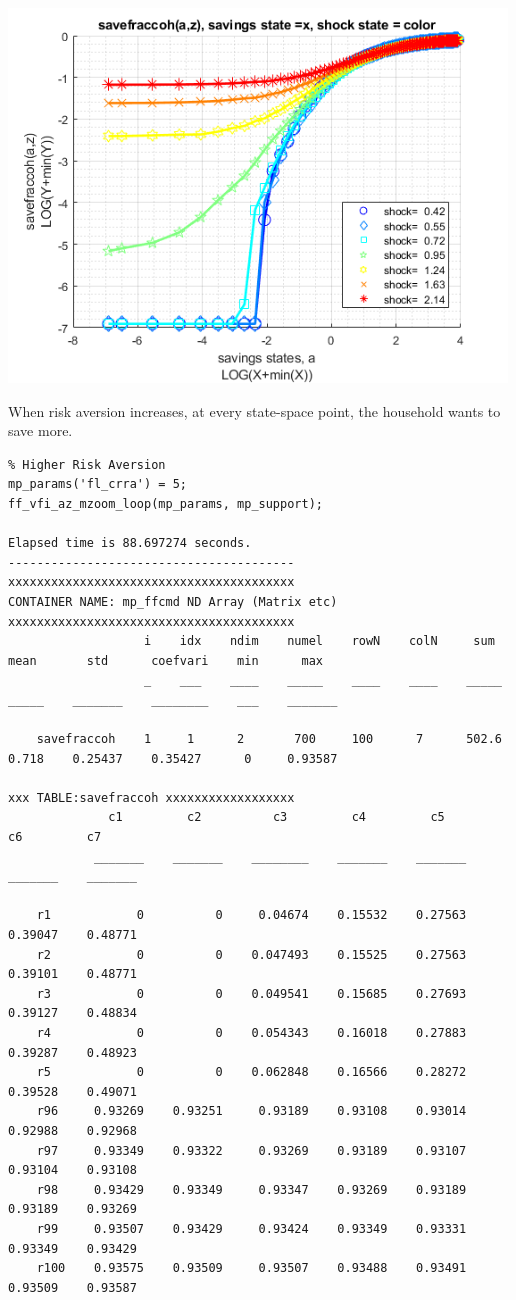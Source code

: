\documentclass[
]{book}
\begin{document}
\includegraphics[width=5.20833in,height=\textheight]{img/fx_vfi_az_mzoom_loop_images/figure_5.png}

When risk aversion increases, at every state-space point, the household
wants to save more.

\begin{verbatim}
% Higher Risk Aversion
mp_params('fl_crra') = 5;
ff_vfi_az_mzoom_loop(mp_params, mp_support);

Elapsed time is 88.697274 seconds.
----------------------------------------
xxxxxxxxxxxxxxxxxxxxxxxxxxxxxxxxxxxxxxxx
CONTAINER NAME: mp_ffcmd ND Array (Matrix etc)
xxxxxxxxxxxxxxxxxxxxxxxxxxxxxxxxxxxxxxxx
                   i    idx    ndim    numel    rowN    colN     sum     mean       std      coefvari    min      max  
                   _    ___    ____    _____    ____    ____    _____    _____    _______    ________    ___    _______

    savefraccoh    1     1      2       700     100      7      502.6    0.718    0.25437    0.35427      0     0.93587

xxx TABLE:savefraccoh xxxxxxxxxxxxxxxxxx
              c1         c2          c3         c4         c5         c6         c7   
            _______    _______    ________    _______    _______    _______    _______

    r1            0          0     0.04674    0.15532    0.27563    0.39047    0.48771
    r2            0          0    0.047493    0.15525    0.27563    0.39101    0.48771
    r3            0          0    0.049541    0.15685    0.27693    0.39127    0.48834
    r4            0          0    0.054343    0.16018    0.27883    0.39287    0.48923
    r5            0          0    0.062848    0.16566    0.28272    0.39528    0.49071
    r96     0.93269    0.93251     0.93189    0.93108    0.93014    0.92988    0.92968
    r97     0.93349    0.93322     0.93269    0.93189    0.93107    0.93104    0.93108
    r98     0.93429    0.93349     0.93347    0.93269    0.93189    0.93189    0.93269
    r99     0.93507    0.93429     0.93424    0.93349    0.93331    0.93349    0.93429
    r100    0.93575    0.93509     0.93507    0.93488    0.93491    0.93509    0.93587
\end{verbatim}
\end{document}
